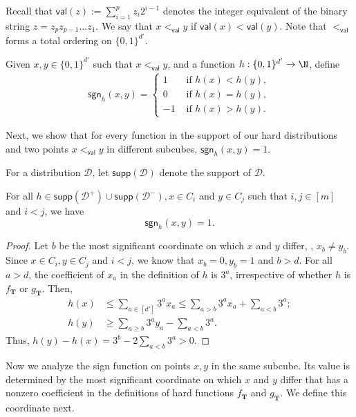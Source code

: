 \documentclass{toc}
\newcommand{\bT}{\ensuremath{\mathbf{T}}}
\newcommand{\cD}{\ensuremath{\mathcal{D}}}
\newcommand{\Yes}{\ensuremath{\mathcal{D}^+}}
\newcommand{\No}{\ensuremath{\mathcal{D}^-}}
\newcommand{\order}{\ensuremath{<_\dec}}
\newcommand{\dd}{\ensuremath{{d'}}}
\newcommand{\dec}{\mathsf{val}}
\newcommand{\sgn}{\mathsf{sgn}}
\newcommand{\supp}{\mathsf{supp}}
\begin{document}
Recall that $\dec(z) := \sum_{i = 1}^p z_i 2^{i-1}$ denotes the integer equivalent of the binary string $z = z_p z_{p-1} \ldots z_1$.
We say that $x \order y$ if $\dec(x) < \dec(y)$. Note that $\order$ forms a total ordering
on $\{0,1\}^{\dd}$.

\begin{definition}
Given $x,y\in \{0,1\}^\dd$ such that $x \order y$, and a function $h:\{0,1\}^\dd\to \N$, define
\begin{align*}
\sgn_h(x,y) =
\begin{cases}
1 &\text{ if } h(x) < h(y), \\
0 &\text{ if } h(x) = h(y), \\
-1 &\text{ if } h(x) > h(y).
\end{cases}
\end{align*}
\end{definition}

%

Next, we show that for every function in the support of our hard distributions and two points $x \order y$ in different subcubes, $\sgn_h(x,y) = 1$.

For a distribution $\cD$, let $\supp(\cD)$ denote the support of $\cD$.

\begin{claim}\label{clm:inv}
For all $h \in \supp(\Yes) \cup \supp(\No), x \in C_i$ and $y \in C_j$ such that $i,j \in [m]$ and $i < j$, we have \[\sgn_h(x,y) = 1.\]
\end{claim}

\begin{proof}
Let $b$ be the most significant coordinate on which $x$ and $y$ differ, \ie, $x_b \neq y_b$. Since $x \in C_i, y \in C_j$ and $i < j$, we know that $x_b = 0, y_b = 1$ and $b > d$. For all $a > d$, the coefficient of $x_a$ in the definition of $h$ is $3^a$, irrespective of whether $h$ is $f_\bT$ or $g_\bT$.
Then,
\begin{align*}
h(x) &\leq \sum\limits_{a \in [\dd]} 3^a x_a \leq \sum\limits_{a > b} 3^a x_a + \sum\limits_{a < b} 3^a ;\\
h(y) &\geq \sum\limits_{a \geq b} 3^a y_a - \sum\limits_{a < b} 3^a.
\end{align*}
Thus, $h(y) - h(x) = 3^b - 2 \sum_{a < b} 3^a > 0$.
%
%
%
%
%
\end{proof}

%

Now we analyze the sign function on points $x,y$ in the same subcube. Its value is determined by the most significant coordinate on which $x$ and $y$ differ that has a nonzero coefficient in the definitions of hard functions $f_\bT$ and $g_\bT$. We define this coordinate next.
\end{document}
